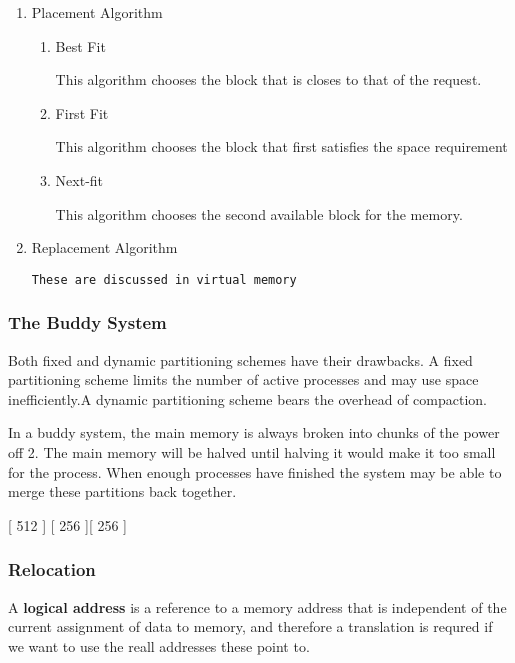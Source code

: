 \documentclass[11pt]{article}
\begin{document}
\begin{enumerate}
\item Placement Algorithm
\label{sec:orgheadline13}

\begin{enumerate}
\item Best Fit
\label{sec:orgheadline10}

This algorithm chooses the block that is closes to that of
the request.

\item First Fit
\label{sec:orgheadline11}

This algorithm chooses the block that first satisfies the
space requirement

\item Next-fit
\label{sec:orgheadline12}

This algorithm chooses the second available block for the
memory.
\end{enumerate}

\item Replacement Algorithm
\label{sec:orgheadline14}

\texttt{These are discussed in virtual memory}
\end{enumerate}

\subsubsection{The Buddy System}
\label{sec:orgheadline16}

Both fixed and dynamic partitioning schemes have their drawbacks.
A fixed partitioning scheme limits the number of active processes
and may use space inefficiently.A dynamic partitioning scheme bears
the overhead of compaction.

In a buddy system, the main memory is always broken into chunks of
the power off 2. The main memory will be halved until halving it
would make it too small for the process. When enough processes have
finished the system may be able to merge these partitions back 
together.

[        512       ]
[   256  ][   256  ]

\subsubsection{Relocation}
\label{sec:orgheadline17}

A \textbf{logical address} is a reference to a memory address that is independent
of the current assignment of data to memory, and therefore a translation is
requred if we want to use the reall addresses these point to.
\end{document}
